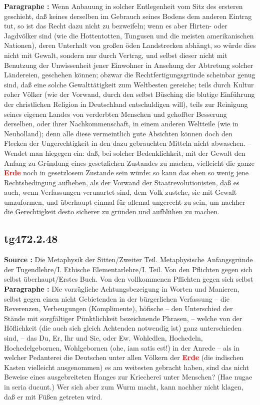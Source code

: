 \documentclass[a4paper,12pt,twoside]{book}
\newcommand{\match}[1]{\textcolor{red}{\textbf{#1}}}
\begin{document}
	\textbf{Paragraphe : }Wenn Anbauung in solcher Entlegenheit vom Sitz des ersteren geschieht, daß keines derselben im Gebrauch seines Bodens dem anderen Eintrag tut, so ist das Recht dazu nicht zu bezweifeln; wenn es aber Hirten- oder Jagdvölker  sind (wie die Hottentotten, Tungusen und die meisten amerikanischen Nationen), deren Unterhalt von großen öden Landstrecken abhängt, so würde dies nicht mit Gewalt, sondern nur durch Vertrag, und selbst dieser nicht mit Benutzung der Unwissenheit jener Einwohner in Ansehung der Abtretung solcher Ländereien, geschehen können; obzwar die Rechtfertigungsgründe scheinbar genug sind, daß eine solche Gewalttätigkeit zum Weltbesten gereiche; teils durch Kultur roher Völker (wie der Vorwand, durch den selbst Büsching die blutige Einführung der christlichen Religion in Deutschland entschuldigen will), teils zur Reinigung seines eigenen Landes von verderbten Menschen und gehoffter Besserung derselben, oder ihrer Nachkommenschaft, in einem anderen Weltteile (wie in Neuholland); denn alle diese vermeintlich gute Absichten können doch den Flecken der Ungerechtigkeit in den dazu gebrauchten Mitteln nicht abwaschen. – Wendet man hiegegen ein: daß, bei solcher Bedenklichkeit, mit der Gewalt den Anfang zu Gründung eines gesetzlichen Zustandes zu machen, vielleicht die ganze \match{Erde} noch in gesetzlosem Zustande sein würde: so kann das eben so wenig jene Rechtsbedingung aufheben, als der Vorwand der Staatrevolutionisten, daß es auch, wenn Verfassungen verunartet sind, dem Volk zustehe, sie mit Gewalt umzuformen, und überhaupt einmal für allemal ungerecht zu sein, um nachher die Gerechtigkeit desto sicherer zu gründen und aufblühen zu machen. 
	
	\subsection*{tg472.2.48} 
	\textbf{Source : }Die Metaphysik der Sitten/Zweiter Teil. Metaphysische Anfangsgründe der Tugendlehre/I. Ethische Elementarlehre/I. Teil. Von den Pflichten gegen sich selbst überhaupt/Erstes Buch. Von den vollkommenen Pflichten gegen sich selbst\\  
	
	\textbf{Paragraphe : }Die vorzügliche Achtungsbezeigung in Worten und Manieren, selbst gegen einen nicht Gebietenden in der bürgerlichen Verfassung – die Reverenzen, Verbeugungen (Komplimente), höfische – den Unterschied der Stände mit sorgfältiger Pünktlichkeit bezeichnende Phrasen, – welche von der Höflichkeit (die auch sich gleich Achtenden notwendig ist) ganz unterschieden sind, – das Du, Er, Ihr und Sie, oder Ew. Wohledlen, Hochedeln, Hochedelgebornen, Wohlgebornen (ohe, iam satis est!) in der Anrede – als in welcher Pedanterei die Deutschen unter allen Völkern der \match{Erde} (die indischen Kasten vielleicht ausgenommen) es am weitesten gebracht haben, sind das nicht Beweise eines ausgebreiteten Hanges zur Kriecherei unter Menschen? (Hae nugae in seria ducunt.) Wer sich aber zum Wurm macht, kann nachher nicht klagen, daß er mit Füßen getreten wird. 
	
\end{document}
